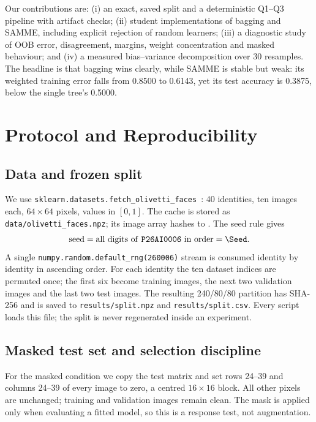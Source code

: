 \documentclass[10pt,twocolumn,letterpaper]{article}
\begin{document}
Our contributions are: (i) an exact, saved split and a deterministic Q1--Q3
pipeline with artifact checks; (ii) student implementations of bagging and
SAMME, including explicit rejection of random learners; (iii) a diagnostic study
of OOB error, disagreement, margins, weight concentration and masked behaviour;
and (iv) a measured bias--variance decomposition over 30 resamples.  The
headline is that bagging wins clearly, while SAMME is stable but weak: its
weighted training error falls from 0.8500 to 0.6143, yet its test accuracy is
0.3875, below the single tree's 0.5000.

\section{Protocol and Reproducibility}

\subsection{Data and frozen split}

We use \texttt{sklearn.datasets.fetch\_olivetti\_faces}~\cite{samaria1994}: 40
identities, ten images each, $64\times64$ pixels, values in $[0,1]$.  The cache
is stored as \texttt{data/olivetti\_faces.npz}; its image array hashes to
\texttt{\DataHash}.  The seed rule gives
\begin{equation}
\text{seed} = \text{all digits of \texttt{P26AI0006} in order} = \Seed.
\end{equation}
A single \texttt{numpy.random.default\_rng(260006)} stream is consumed identity
by identity in ascending order.  For each identity the ten dataset indices are
permuted once; the first six become training images, the next two validation
images and the last two test images.  The resulting 240/80/80 partition has
SHA-256 \texttt{\SplitHash} and is saved to \texttt{results/split.npz} and
\texttt{results/split.csv}.  Every script loads this file; the split is never
regenerated inside an experiment.

\subsection{Masked test set and selection discipline}

For the masked condition we copy the test matrix and set rows 24--39 and
columns 24--39 of every image to zero, a centred $16\times16$ block.  All other
pixels are unchanged; training and validation images remain clean.  The mask is
applied only when evaluating a fitted model, so this is a response test, not
augmentation.
\end{document}
